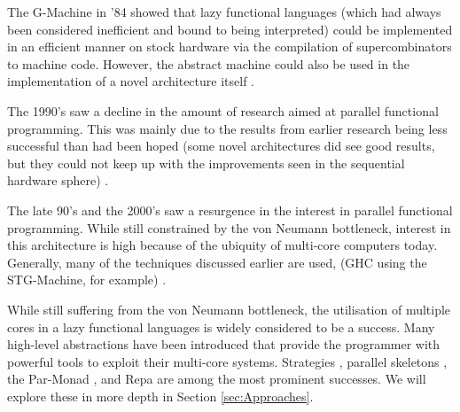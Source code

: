 The G-Machine in '84 showed that lazy functional languages (which had always
been considered inefficient and bound to being interpreted) could be
implemented in an efficient manner on stock hardware via the compilation of
supercombinators to machine code. However, the abstract machine could also be
used in the implementation of a novel architecture itself
\citep{Augustsson:LazyMLCompiler}.

    The 1990's saw a decline in the amount of research aimed at parallel
functional programming. This was mainly due to the results from earlier research
being less successful than had been hoped (some novel architectures did see good
results, but they could not keep up with the improvements seen in the sequential
hardware sphere) \citep{PFPAnIntro, clackbook}.

The late 90's and the 2000's saw a resurgence in the interest in parallel
functional programming. While still constrained by the von Neumann bottleneck,
interest in this architecture is high because of the ubiquity of multi-core
computers today. Generally, many of the techniques discussed earlier are used,
(GHC using the STG-Machine, for example) \citep{buckwheat, haskellSharedMem}.


While still suffering from the von Neumann bottleneck, the utilisation of
multiple cores in a lazy functional languages is widely considered to be a
success. Many high-level abstractions have been introduced that provide the
programmer with powerful tools to exploit their multi-core systems. Strategies
\citep{strategies}, parallel skeletons \citep{skeletons}, the Par-Monad
\citep{marlow2011monad}, and Repa \citep{repa} are among the most prominent
successes. We will explore these in more depth in Section \ref{sec:Approaches}.
